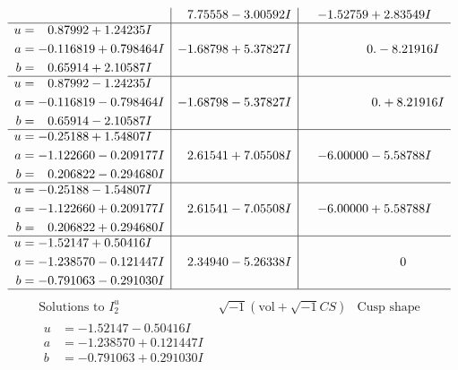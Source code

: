 \documentclass[1p]{elsarticle_modified}
\theoremstyle{definition}
\newcommand{\I}{\sqrt{-1}}
\begin{document}
$$\begin{array}{c|c|c}
 & \phantom{-}7.75558 - 3.00592 I & -1.52759 + 2.83549 I \\ \hline\begin{aligned}
u &= \phantom{-}0.87992 + 1.24235 I \\
a &= -0.116819 + 0.798464 I \\
b &= \phantom{-}0.65914 + 2.10587 I\end{aligned}
 & -1.68798 + 5.37827 I & \phantom{-0.000000 } 0. - 8.21916 I \\ \hline\begin{aligned}
u &= \phantom{-}0.87992 - 1.24235 I \\
a &= -0.116819 - 0.798464 I \\
b &= \phantom{-}0.65914 - 2.10587 I\end{aligned}
 & -1.68798 - 5.37827 I & \phantom{-0.000000 -}0. + 8.21916 I \\ \hline\begin{aligned}
u &= -0.25188 + 1.54807 I \\
a &= -1.122660 - 0.209177 I \\
b &= \phantom{-}0.206822 - 0.294680 I\end{aligned}
 & \phantom{-}2.61541 + 7.05508 I & -6.00000 - 5.58788 I \\ \hline\begin{aligned}
u &= -0.25188 - 1.54807 I \\
a &= -1.122660 + 0.209177 I \\
b &= \phantom{-}0.206822 + 0.294680 I\end{aligned}
 & \phantom{-}2.61541 - 7.05508 I & -6.00000 + 5.58788 I \\ \hline\begin{aligned}
u &= -1.52147 + 0.50416 I \\
a &= -1.238570 - 0.121447 I \\
b &= -0.791063 - 0.291030 I\end{aligned}
 & \phantom{-}2.34940 - 5.26338 I & \phantom{-0.000000 } 0\\
 \hline 
 \end{array}$$\newpage$$\begin{array}{c|c|c}  
\text{Solutions to }I^u_{2}& \I (\text{vol} + \sqrt{-1}CS) & \text{Cusp shape}\\
 \hline 
\begin{aligned}
u &= -1.52147 - 0.50416 I \\
a &= -1.238570 + 0.121447 I \\
b &= -0.791063 + 0.291030 I\end{aligned}

\end{array}$$
\end{document}
